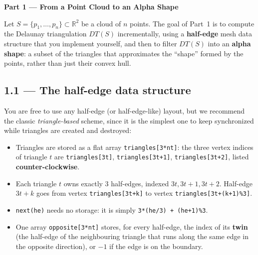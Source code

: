 \documentclass[11pt,a4paper]{article}
\newcommand{\homeworkpart}[2]{%
  \vspace{0.6em}
  \begin{tcolorbox}[colback=navy,colframe=navy,arc=0pt,boxrule=0pt,
    left=10pt,right=10pt,top=7pt,bottom=7pt]
    {\color{white}\bfseries\large Part #1 --- #2}
  \end{tcolorbox}
  \vspace{0.4em}
}
\begin{document}
\homeworkpart{1}{From a Point Cloud to an Alpha Shape}

Let $S=\{p_1,\dots,p_n\}\subset\mathbb{R}^2$ be a cloud of $n$ points. The
goal of Part~1 is to compute the Delaunay triangulation $DT(S)$
incrementally, using a \textbf{half-edge} mesh data structure that you
implement yourself, and then to filter $DT(S)$ into an \textbf{alpha shape}:
a subset of the triangles that approximates the ``shape'' formed by the
points, rather than just their convex hull.

\subsection*{1.1 --- The half-edge data structure}

You are free to use any half-edge (or half-edge-like) layout, but we
recommend the classic \emph{triangle-based} scheme, since it is the
simplest one to keep synchronized while triangles are created and destroyed:

\begin{itemize}[leftmargin=1.4em]
  \item Triangles are stored as a flat array \lstinline{triangles[3*nt]}: the
    three vertex indices of triangle $t$ are
    \lstinline{triangles[3t]}, \lstinline{triangles[3t+1]}, \lstinline{triangles[3t+2]},
    listed \textbf{counter-clockwise}.
  \item Each triangle $t$ owns exactly 3 half-edges, indexed $3t,3t+1,3t+2$.
    Half-edge $3t+k$ goes from vertex \lstinline{triangles[3t+k]} to vertex
    \lstinline{triangles[3t+(k+1)%3]}.
  \item \lstinline{next(he)} needs no storage: it is simply
    \lstinline{3*(he/3) + (he+1)%3}.
  \item One array \lstinline{opposite[3*nt]} stores, for every half-edge, the
    index of its \textbf{twin} (the half-edge of the neighbouring triangle
    that runs along the same edge in the opposite direction), or $-1$ if the
    edge is on the boundary.
\end{itemize}
\end{document}
